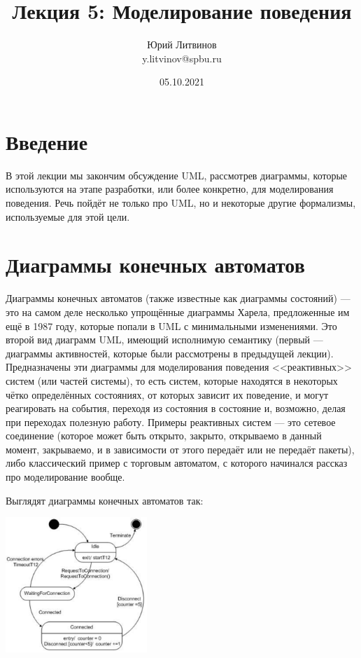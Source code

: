\documentclass[a5paper]{article}
\title{Лекция 5:  Моделирование поведения}
\author{Юрий Литвинов\\\small{y.litvinov@spbu.ru}}
\date{05.10.2021}
\begin{document}
\maketitle
\thispagestyle{empty}

\section{Введение}

В этой лекции мы закончим обсуждение UML, рассмотрев диаграммы, которые используются на этапе разработки, или более конкретно, для моделирования поведения. Речь пойдёт не только про UML, но и некоторые другие формализмы, используемые для этой цели.

\section{Диаграммы конечных автоматов}

Диаграммы конечных автоматов (также известные как диаграммы состояний) --- это на самом деле несколько упрощённые диаграммы Харела, предложенные им ещё в 1987 году, которые попали в UML с минимальными изменениями. Это второй вид диаграмм UML, имеющий исполнимую семантику (первый --- диаграммы активностей, которые были рассмотрены в предыдущей лекции). Предназначены эти диаграммы для моделирования поведения <<реактивных>> систем (или частей системы), то есть систем, которые находятся в некоторых чётко определённых состояниях, от которых зависит их поведение, и могут реагировать на события, переходя из состояния в состояние и, возможно, делая при переходах полезную работу. Примеры реактивных систем --- это сетевое соединение (которое может быть открыто, закрыто, открываемо в данный момент, закрываемо, и в зависимости от этого передаёт или не передаёт пакеты), либо классический пример с торговым автоматом, с которого начинался рассказ про моделирование вообще.

Выглядят диаграммы конечных автоматов так:

\begin{center}
    \includegraphics[width=0.4\textwidth]{stateTransitionExample.png}
\end{center}
\end{document}
